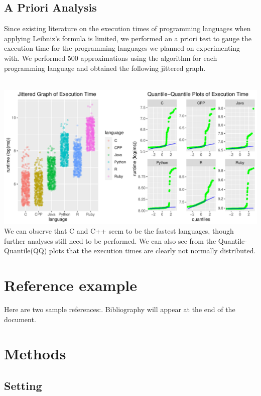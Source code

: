 \documentclass[12pt,halfline,a4paper,]{ouparticle}
\begin{document}
\hypertarget{a-priori-analysis}{%
\subsection{A Priori Analysis}\label{a-priori-analysis}}

Since existing literature on the execution times of programming
languages when applying Leibniz's formula is limited, we performed an a
priori test to gauge the execution time for the programming languages we
planned on experimenting with. We performed 500 approximations using the
algorithm for each programming language and obtained the following
jittered graph.\\
\strut \\

\includegraphics[width=1\linewidth]{skeleton_files/figure-latex/figPrior-1}
We can observe that C and C++ seem to be the fastest languages, though
further analyses still need to be performed. We can also see from the
Quantile-Quantile(QQ) plots that the execution times are clearly not
normally distributed.

\newpage

\hypertarget{reference-example}{%
\section{Reference example}\label{reference-example}}

Here are two sample references:. Bibliography will appear at the end of
the document.

\hypertarget{methods}{%
\section{Methods}\label{methods}}

\hypertarget{setting}{%
\subsection{Setting}\label{setting}}
\end{document}
